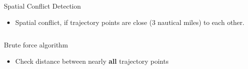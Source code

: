 \documentclass[10pt]{beamer}
\begin{document}
\begin{frame}[t]{Spatial Conflict Detection}
    \begin{itemize}
        \item Spatial conflict, if trajectory points are close (3 nautical miles) to each other.
    \end{itemize}
    \begin{overprint}
	\begin{columns}[t]
         {
            \begin{block}{Brute force algorithm}
                \begin{itemize}
                    \item Check distance between nearly {\bf all} trajectory points
                \end{itemize} 
                \begin{center}

\end{center}
\end{block}}
\end{columns}
\end{overprint}
\end{frame}
\end{document}

